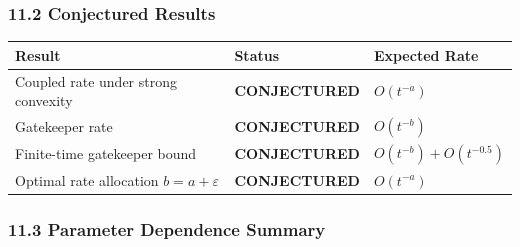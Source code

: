 \documentclass[
  12pt,
]{article}
\begin{document}
\subsubsection{11.2 Conjectured Results}\label{conjectured-results}

\begin{longtable}[]{@{}
  >{\raggedright\arraybackslash}p{}
  >{\raggedright\arraybackslash}p{}
  >{\raggedright\arraybackslash}p{}@{}}
\toprule\noalign{}
\begin{minipage}[b]{\linewidth}\raggedright
Result
\end{minipage} & \begin{minipage}[b]{\linewidth}\raggedright
Status
\end{minipage} & \begin{minipage}[b]{\linewidth}\raggedright
Expected Rate
\end{minipage} \\
\midrule\noalign{}
\endhead
\bottomrule\noalign{}
\endlastfoot
Coupled rate under strong convexity & \textbf{CONJECTURED} &
\(O(t^{-a})\) \\
Gatekeeper rate & \textbf{CONJECTURED} & \(O(t^{-b})\) \\
Finite-time gatekeeper bound & \textbf{CONJECTURED} &
\(O(t^{-b}) + O(t^{-0.5})\) \\
Optimal rate allocation \(b = a + \varepsilon\) & \textbf{CONJECTURED} &
\(O(t^{-a})\) \\
\end{longtable}

\subsubsection{11.3 Parameter Dependence
Summary}\label{parameter-dependence-summary}
\end{document}
